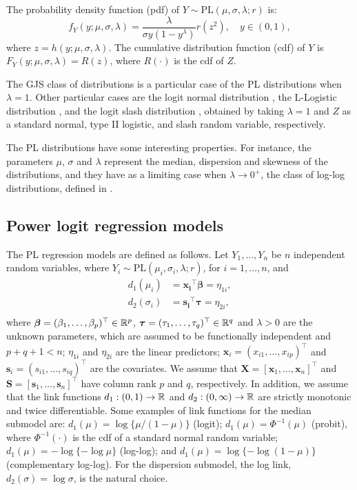 The probability density function (pdf) of $Y \sim \mbox{PL} (\mu, \sigma, \lambda; r)$ is:
%
\begin{equation*}
f_Y(y; \mu, \sigma, \lambda)= \frac{\lambda}{\sigma y(1-y^\lambda)} r (z^2), \quad y \in (0,1),
\end{equation*}
%
where $z=h(y; \mu, \sigma, \lambda)$. The cumulative distribution function (cdf) of $Y$ is $F_Y(y; \mu, \sigma, \lambda) = R(z)$, where $R(\cdot)$ is the cdf of $Z$.

The GJS class of distributions is a particular case of the PL distributions when $\lambda =1$. Other particular cases are the logit normal distribution \citep{Johnson1949}, the L-Logistic distribution \citep{daPazetal2019}, and the logit slash distribution \citep{Korkmaz2020}, obtained by taking $\lambda =1$ and $Z$ as a standard normal, type II logistic, and slash random variable, respectively.


The PL distributions have some interesting properties. For instance, the parameters $\mu$, $\sigma$ and $\lambda$ represent the median, dispersion and skewness of the distributions, and they have as a limiting case when $\lambda \rightarrow 0^+$, the class of log-log distributions, defined in \cite{QueirozFerrari2023}.


\subsection{Power logit regression models}

The PL regression models are defined as follows. Let $Y_1,\ldots,Y_n$ be $n$ independent random variables, where $Y_i \sim \text{PL}(\mu_i, \sigma_i, \lambda; r)$, for $i=1,\ldots,n$, and
%
\begin{equation}\label{linkfun}
\begin{split}
d_1 (\mu_i) &= \bm{x_i}^{\top} \bm{\beta} = \eta_{1i}, \\ 
d_2 (\sigma_i) &= \bm{s_i}^{\top} \bm{\tau} = \eta_{2i},\\
\end{split} 
\end{equation}
%
where $\bm{\beta}=(\beta_1, \ldots, \beta_p)^{\top} \in \mathbb{R}^p$, $\bm{\tau}=(\tau_1, \ldots, \tau_q)^{\top} \in \mathbb{R}^q$ and $\lambda>0$ are the unknown parameters, which are assumed to be functionally independent and $p+q+1<n$; $\eta_{1i}$ and $\eta_{2i}$ are the linear predictors; $\bm{x}_i = (x_{i1}, \ldots, x_{ip})^{\top}$ and $\bm{s}_i = (s_{i1}, \ldots, s_{iq})^{\top}$ are the covariates. We assume that $\textbf{X}=[\bm{x}_1,\ldots,\bm{x}_n]^\top$ and $\textbf{S}=[\bm{s}_1,\ldots,\bm{s}_n]^\top$ have column rank $p$ and $q$, respectively. In addition, we assume that the link functions $d_1:(0,1)\to\mathbb{R}$ and
$d_2:(0,\infty)\to\mathbb{R}$ are strictly monotonic and twice differentiable. Some examples of link functions for the median submodel are: $d_1(\mu) = \log \{\mu/(1-\mu)\}$ (logit); $d_1(\mu) = \Phi^{-1}(\mu)$ (probit), where $\Phi^{-1}(\cdot)$ is the cdf of a standard normal random variable; $d_1(\mu) = - \log \{ - \log \mu \}$ (log-log); and $d_1(\mu) = \log \{ - \log(1-\mu)\}$ (complementary log-log). For the dispersion submodel, the log link, $d_2(\sigma) = \log \sigma$, is the natural choice.

